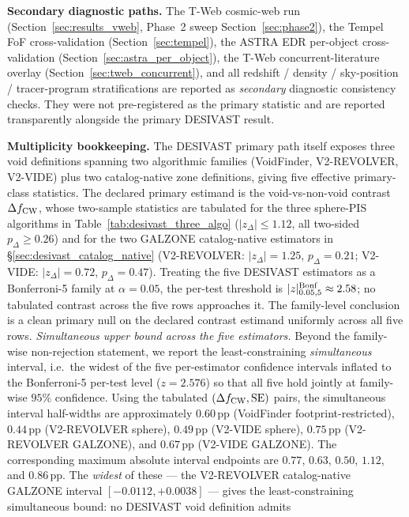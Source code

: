\documentclass[aps,prd,twocolumn,superscriptaddress,showpacs,preprintnumbers,nofootinbib,longbibliography,floatfix]{revtex4-2}
\begin{document}
\textbf{Secondary diagnostic paths.} The T-Web cosmic-web run
(Section~\ref{sec:results_vweb}, Phase~2 sweep
Section~\ref{sec:phase2}), the Tempel FoF cross-validation
(Section~\ref{sec:tempel}), the ASTRA EDR per-object
cross-validation (Section~\ref{sec:astra_per_object}), the
T-Web concurrent-literature overlay
(Section~\ref{sec:tweb_concurrent}), and all redshift / density /
sky-position / tracer-program stratifications are reported as
\emph{secondary} diagnostic consistency checks. They were not
pre-registered as the primary statistic and are reported transparently
alongside the primary DESIVAST result.

\textbf{Multiplicity bookkeeping.} The DESIVAST primary path itself
exposes three void definitions spanning two algorithmic families (VoidFinder,
V2-REVOLVER, V2-VIDE) plus two catalog-native zone definitions, giving
five effective primary-class statistics. The declared primary estimand
is the void-vs-non-void contrast $\Delta f_{\rm CW}$, whose two-sample
statistics are tabulated for the three sphere-PIS algorithms in
Table~\ref{tab:desivast_three_algo} ($|z_\Delta| \leq 1.12$, all
two-sided $p_\Delta \geq 0.26$) and for the two GALZONE catalog-native
estimators in \S\ref{sec:desivast_catalog_native}
(V2-REVOLVER: $|z_\Delta| = 1.25$, $p_\Delta = 0.21$;
V2-VIDE: $|z_\Delta| = 0.72$, $p_\Delta = 0.47$). Treating the five
DESIVAST estimators as a Bonferroni-5 family at $\alpha = 0.05$, the
per-test threshold is $|z|^{\rm Bonf}_{0.05,5} \approx 2.58$; no
tabulated contrast across the five rows approaches it. The
family-level conclusion is a clean primary null on the declared
contrast estimand uniformly across all five rows.
\emph{Simultaneous upper bound across the five estimators.} Beyond the
family-wise non-rejection statement, we report the least-constraining
\emph{simultaneous} interval, i.e.\ the widest of the five per-estimator
confidence intervals inflated to the Bonferroni-5 per-test level
($z = 2.576$) so that all five hold jointly at family-wise $95\%$
confidence. Using the tabulated $(\Delta f_{\rm CW}, {\rm SE})$ pairs,
the simultaneous interval half-widths are approximately $0.60$\,pp
(VoidFinder footprint-restricted), $0.44$\,pp (V2-REVOLVER sphere),
$0.49$\,pp (V2-VIDE sphere), $0.75$\,pp (V2-REVOLVER GALZONE), and
$0.67$\,pp (V2-VIDE GALZONE). The corresponding maximum absolute
interval endpoints are $0.77$, $0.63$, $0.50$, $1.12$, and $0.86$\,pp.
The
\emph{widest} of these --- the V2-REVOLVER catalog-native GALZONE
interval $[-0.0112, +0.0038]$ --- gives the least-constraining
simultaneous bound: no DESIVAST void definition admits
\end{document}
